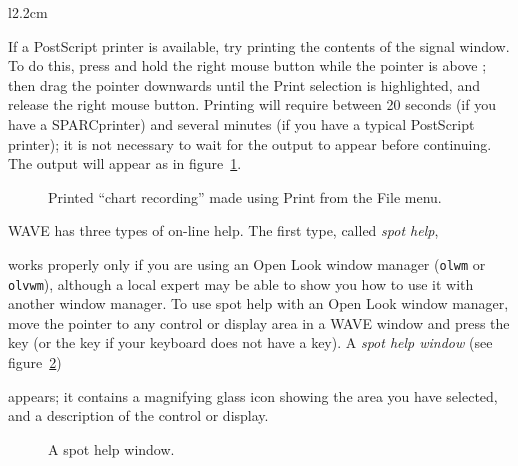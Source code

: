 \documentclass[twoside]{book}
\newcommand{\keycap}[1]{\cornersize{.5}\Ovalbox{\small\sf #1}}
\newcommand{\button}[1]{\cornersize{2}\ovalbox{\rule[-.3mm]{0cm}{2.5mm}\small\sf ~#1~}}
\newcommand{\menubutton}[1]{\button{#1~\ensuremath{\nabla}}}
\newcommand{\WAVE}{{\sf WAVE}\xspace}
\begin{document}
\begin{wrapfigure}{l}{2.2cm}
\mbox{}
\end{wrapfigure}
If a PostScript printer is available, try printing the contents of the
signal window.  To do this, press and hold the right mouse button
while the pointer is above \menubutton{File}; then drag the pointer
downwards until the {\sf Print} selection is
highlighted, and release
the right mouse button.  Printing will require between 20 seconds (if
you have a SPARCprinter) and several minutes (if you have a typical
PostScript printer); it is not necessary to wait for the output to
appear before continuing.  The output will appear as in
figure~\ref{fig:chart1}.
\begin{figure}
\caption{Printed ``chart recording'' made using {\sf Print} from the
{\sf File} menu.}
\label{fig:chart1}
\end{figure}

\WAVE{} has three types of on-line help.
The first type, called \emph{spot help},
\begin{htmlonly}
\end{htmlonly}
\begin{latexonly}
\end{latexonly}
works properly only if you are using an Open Look
window manager ({\tt olwm} or {\tt olvwm}),
although a local expert may
be able to show you how to use it with another window manager.  To
use spot help with an Open Look window manager, move the pointer to
any control or display area in a \WAVE{} window and press the
\keycap{HELP} key (or the \keycap{F1} key if your keyboard does not
have a \keycap{HELP} key).  A \emph{spot help window} (see
figure~\ref{fig:spot-help}) 
\begin{htmlonly}
\end{htmlonly}
\begin{latexonly}
\end{latexonly}
appears; it contains a
magnifying glass icon showing the area you have selected, and a
description of the control or display.
\begin{figure}
\centerline{} \caption{A spot help window.}
\begin{htmlonly}
\end{htmlonly}
\begin{latexonly}
\end{latexonly}
\label{fig:spot-help}
\end{figure}
\end{document}
